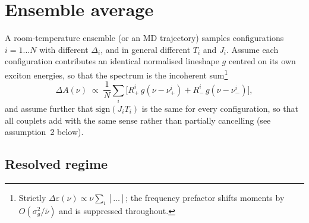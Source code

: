 \documentclass[11pt,a4paper]{article}
\begin{document}
\section{Ensemble average}

A room-temperature ensemble (or an MD trajectory) samples configurations
$i=1\ldots N$ with different $\Delta_{i}$, and in general different $T_{i}$ and
$J_{i}$. Assume each configuration contributes an identical normalised
lineshape $g$ centred on its own exciton energies, so that the spectrum is the
incoherent sum\footnote{Strictly $\Delta\varepsilon(\nu)\propto
\nu\sum_i[\ldots]$; the frequency prefactor shifts moments by
$O(\sigma_g^{2}/\bar\nu)$ and is suppressed throughout.}
\begin{equation}
\Delta A(\nu)\;\propto\;\frac{1}{N}\sum_{i}\Big[
R^{i}_{+}\,g\!\left(\nu-\nu^{i}_{+}\right)
+R^{i}_{-}\,g\!\left(\nu-\nu^{i}_{-}\right)\Big],
\label{eq:ensemble}
\end{equation}
and assume further that $\mathrm{sign}(J_{i}T_{i})$ is the same for every
configuration, so that all couplets add with the same sense rather than
partially cancelling (see assumption~2 below).

\subsection{Resolved regime}
\end{document}
